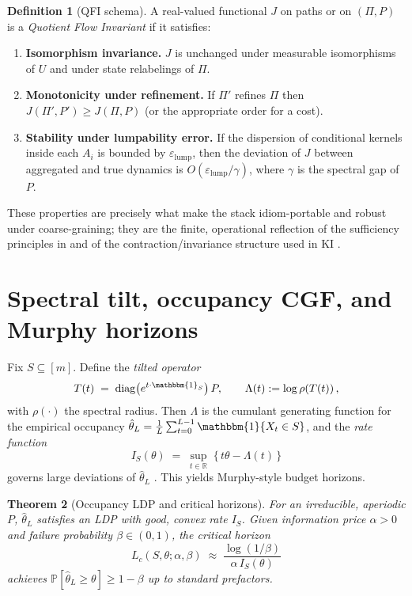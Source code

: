 \documentclass[11pt]{article}
\theoremstyle{plain}
\newtheorem{theorem}{Theorem}
\theoremstyle{definition}
\newtheorem{definition}[theorem]{Definition}
\theoremstyle{remark}
\newcommand{\Prob}{\mathbb{P}}
\newcommand{\1}{\mathbbm{1}}
\begin{document}
\begin{definition}[QFI schema]
A real-valued functional \(J\) on paths or on \((\Pi,P)\) is a \emph{Quotient Flow Invariant} if it satisfies:
\begin{enumerate}
  \item \textbf{Isomorphism invariance.} \(J\) is unchanged under measurable isomorphisms of \(U\) and under state relabelings of \(\Pi\).
  \item \textbf{Monotonicity under refinement.} If \(\Pi'\) refines \(\Pi\) then \(J(\Pi',P')\ge J(\Pi,P)\) (or the appropriate order for a cost).
  \item \textbf{Stability under lumpability error.} If the dispersion of conditional kernels inside each \(A_i\) is bounded by \(\varepsilon_{\mathrm{lump}}\), then the deviation of \(J\) between aggregated and true dynamics is \(O(\varepsilon_{\mathrm{lump}}/\gamma)\), where \(\gamma\) is the spectral gap of \(P\).
\end{enumerate}
\end{definition}

These properties are precisely what make the stack idiom-portable and robust under coarse-graining; they are the finite, operational reflection of the sufficiency principles in \parencite{Blackwell1953,AmariNagaoka2000,Cencov1982} and of the contraction/invariance structure used in KI \parencite{elliott2025ki}.

\section{Spectral tilt, occupancy CGF, and Murphy horizons}\label{sec:spectral}
Fix \(S\subseteq[m]\). Define the \emph{tilted operator}
\begin{equation}
  T(t)\;=\;\mathrm{diag}\big(e^{t\cdot \1_S}\big)\,P,\qquad \Lambda(t):=\log\rho\!\left(T(t)\right),
\end{equation}
with \(\rho(\cdot)\) the spectral radius. Then \(\Lambda\) is the cumulant generating function for the empirical occupancy \(\hat\theta_L=\frac{1}{L}\sum_{t=0}^{L-1}\1\{X_t\in S\}\), and the \emph{rate function}
\begin{equation}
  I_S(\theta)\;=\;\sup_{t\in\mathbb{R}}\;\{\,t\theta-\Lambda(t)\,\}
\end{equation}
governs large deviations of \(\hat\theta_L\) \parencite{DemboZeitouni1998}. This yields Murphy-style budget horizons.

\begin{theorem}[Occupancy LDP and critical horizons]\label{thm:ldp}
For an irreducible, aperiodic \(P\), \(\hat\theta_L\) satisfies an LDP with good, convex rate \(I_S\). Given information price \(\alpha>0\) and failure probability \(\beta\in(0,1)\), the \emph{critical horizon}
\begin{equation}
  L_c(S,\theta;\alpha,\beta)\;\approx\;\frac{\log(1/\beta)}{\alpha\,I_S(\theta)}
\end{equation}
achieves \(\Prob[\hat\theta_L\ge\theta]\ge 1-\beta\) up to standard prefactors.
\end{theorem}
\end{document}
